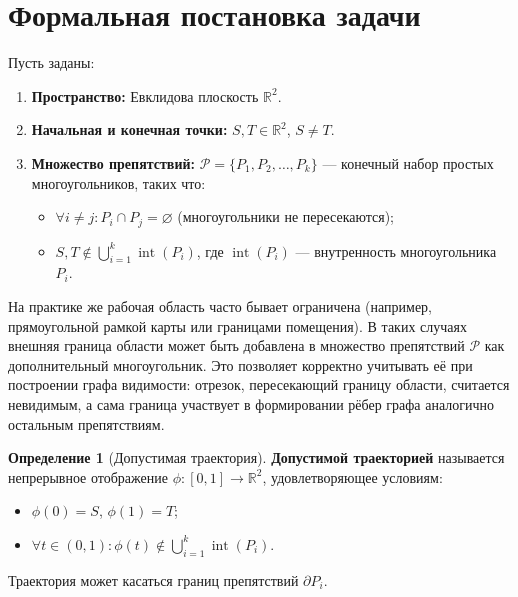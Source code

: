 \documentclass{article}
\theoremstyle{definition}
\newtheorem{definition}{Определение}
\begin{document}

\section{Формальная постановка задачи}
\label{sec:problem}

Пусть заданы:
\begin{enumerate}[label=\textbf{\arabic*.}]
    \item \textbf{Пространство:} Евклидова плоскость $\mathbb{R}^2$.
    \item \textbf{Начальная и конечная точки:} $S, T \in \mathbb{R}^2$, $S \neq T$.
    \item \textbf{Множество препятствий:} $\mathcal{P} = \{P_1, P_2, \dots, P_k\}$ --- конечный набор простых многоугольников, таких что:
    \begin{itemize}
        \item $\forall i \neq j: P_i \cap P_j = \varnothing$ (многоугольники не пересекаются);
        \item $S, T \notin \bigcup_{i=1}^k \operatorname{int}(P_i)$, где $\operatorname{int}(P_i)$ --- внутренность многоугольника $P_i$.
    \end{itemize}
\end{enumerate}

На практике же рабочая область часто бывает ограничена (например, прямоугольной рамкой карты или границами помещения). 
В таких случаях внешняя граница области может быть добавлена в множество препятствий $\mathcal{P}$ как дополнительный многоугольник. 
Это позволяет корректно учитывать её при построении графа видимости: отрезок, пересекающий границу области, считается невидимым, 
а сама граница участвует в формировании рёбер графа аналогично остальным препятствиям.

\begin{definition}[Допустимая траектория]
\textbf{Допустимой траекторией} называется непрерывное отображение $\phi: [0, 1] \to \mathbb{R}^2$, удовлетворяющее условиям:
\begin{itemize}
    \item $\phi(0) = S$, $\phi(1) = T$;
    \item $\forall t \in (0, 1): \phi(t) \notin \bigcup_{i=1}^k \operatorname{int}(P_i)$.
\end{itemize}
Траектория может касаться границ препятствий $\partial P_i$.
\end{definition}
\end{document}
